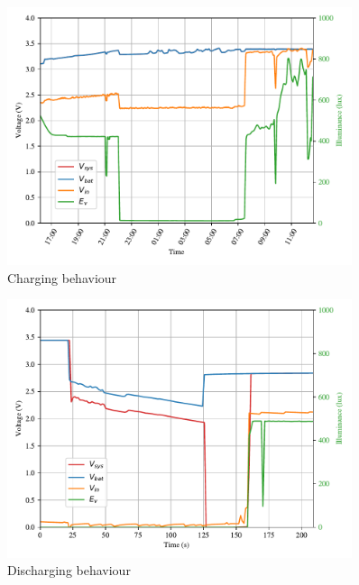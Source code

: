 \begin{figure}[h]
	\centering
	\includegraphics[width=0.9\textwidth]{5-development/hardware/graphics/laden.pdf}
	\caption{Charging behaviour\label{development:charge}}
\end{figure}

\begin{figure}[h]
	\centering
	\includegraphics[width=0.9\textwidth]{5-development/hardware/graphics/entladen.pdf}
	\caption{Discharging behaviour\label{development:discharge}}
\end{figure}